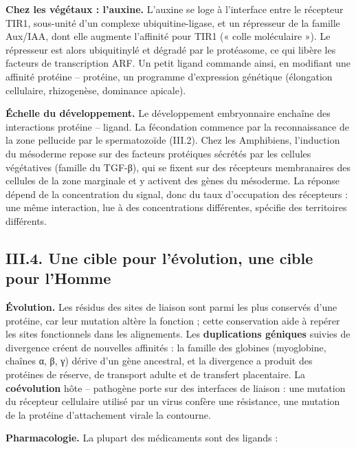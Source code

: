 \documentclass[11pt,a4paper]{article}
\begin{document}
\textbf{Chez les végétaux : l'auxine.} L'auxine se loge à l'interface entre le récepteur TIR1, sous-unité d'un complexe ubiquitine-ligase, et un répresseur de la famille Aux/IAA, dont elle augmente l'affinité pour TIR1 (« colle moléculaire »). Le répresseur est alors ubiquitinylé et dégradé par le protéasome, ce qui libère les facteurs de transcription ARF. Un petit ligand commande ainsi, en modifiant une affinité protéine -- protéine, un programme d'expression génétique (élongation cellulaire, rhizogenèse, dominance apicale).

\textbf{Échelle du développement.} Le développement embryonnaire enchaîne des interactions protéine -- ligand. La fécondation commence par la reconnaissance de la zone pellucide par le spermatozoïde (III.2). Chez les Amphibiens, l'induction du mésoderme repose sur des facteurs protéiques sécrétés par les cellules végétatives (famille du TGF-β), qui se fixent sur des récepteurs membranaires des cellules de la zone marginale et y activent des gènes du mésoderme. La réponse dépend de la concentration du signal, donc du taux d'occupation des récepteurs : une même interaction, lue à des concentrations différentes, spécifie des territoires différents.

\hypertarget{iii.4.-une-cible-pour-luxe9volution-une-cible-pour-lhomme}{%
\subsection{III.4. Une cible pour l'évolution, une cible pour l'Homme}\label{iii.4.-une-cible-pour-luxe9volution-une-cible-pour-lhomme}}

\textbf{Évolution.} Les résidus des sites de liaison sont parmi les plus conservés d'une protéine, car leur mutation altère la fonction ; cette conservation aide à repérer les sites fonctionnels dans les alignements. Les \textbf{duplications géniques} suivies de divergence créent de nouvelles affinités : la famille des globines (myoglobine, chaînes α, β, γ) dérive d'un gène ancestral, et la divergence a produit des protéines de réserve, de transport adulte et de transfert placentaire. La \textbf{coévolution} hôte -- pathogène porte sur des interfaces de liaison : une mutation du récepteur cellulaire utilisé par un virus confère une résistance, une mutation de la protéine d'attachement virale la contourne.

\textbf{Pharmacologie.} La plupart des médicaments sont des ligands :
\end{document}
